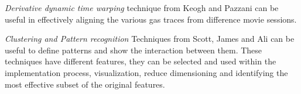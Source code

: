 \documentclass[letterpaper, 10 pt, conference]{ieeeconf}  %
\begin{document}
\textit{Derivative dynamic time warping} technique from Keogh and Pazzani \cite{doi:10.1137/1.9781611972719.1} can be useful in effectively aligning the various gas traces from difference movie sessions.

\textit{Clustering and Pattern recognition} Techniques from Scott, James and Ali \cite{Scott2006} can be useful to define patterns and show the interaction between them. These techniques have different features, they can be selected and used within the implementation process, visualization, reduce dimensioning and identifying the most effective subset of the original features.  
\addtolength{\textheight}{-12cm}   %


















\end{document}
